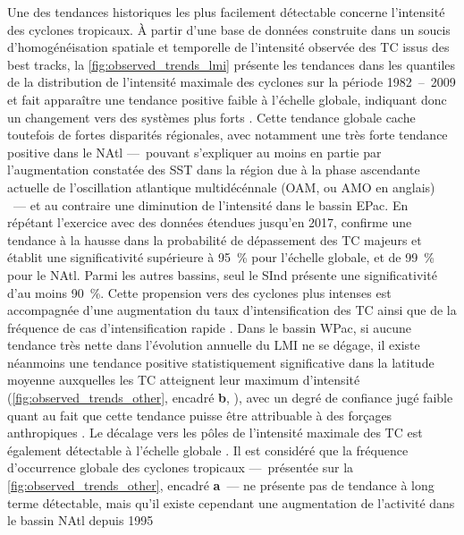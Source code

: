 \documentclass[../main.tex]{subfiles}
\begin{document}
Une des tendances historiques les plus facilement détectable concerne l'intensité des cyclones tropicaux. À partir d'une base de données construite dans un
soucis d'homogénéisation spatiale et temporelle de l'intensité observée des TC issus des best tracks, la \cref{fig:observed_trends_lmi} présente les tendances
dans les quantiles de la distribution de l'intensité maximale des cyclones sur la période \num{1982}~--~\num{2009} et fait apparaître une tendance positive
faible à l'échelle globale, indiquant donc un changement vers des systèmes plus forts \parencite{kossin_trend_2013}. Cette tendance globale cache toutefois de
fortes disparités régionales, avec notamment une très forte tendance positive dans le NAtl ---~pouvant s'expliquer au moins en partie par l'augmentation
constatée des SST dans la région due à la phase ascendante actuelle de l'oscillation atlantique multidécénnale (OAM, ou AMO en anglais)
\parencite{ting_forced_2009}~--- et au contraire une diminution de l'intensité dans le bassin EPac. En répétant l'exercice avec des données étendues jusqu'en
\num{2017}, \cite{kossin_global_2020} confirme une tendance à la hausse dans la probabilité de dépassement des TC majeurs et établit une significativité
supérieure à \SI{95}{\percent} pour l'échelle globale, et de \SI{99}{\percent} pour le NAtl. Parmi les autres bassins, seul le SInd présente une significativité
d'au moins \SI{90}{\percent}. Cette propension vers des cyclones plus intenses est accompagnée d'une augmentation du taux d'intensification des TC ainsi que de
la fréquence de cas d'intensification rapide \parencite{balaguru_increasing_2018,kishtawal_tropical_2012}. Dans le bassin WPac, si aucune tendance très nette
dans l'évolution annuelle du LMI ne se dégage, il existe néanmoins une tendance positive statistiquement significative dans la latitude moyenne auxquelles les
TC atteignent leur maximum d'intensité (\cref{fig:observed_trends_other}, encadré \textbf{b}, \hbox{\cite{kossin_comment_2018}}), avec un degré de confiance
jugé faible quant au  fait que cette tendance puisse être attribuable à des forçages anthropiques \parencite{knutson_tropical_2019}. Le décalage vers les pôles
de l'intensité maximale des TC est également détectable à l'échelle globale \parencite{kossin_poleward_2014}. Il est considéré que la fréquence d'occurrence
globale des cyclones tropicaux ---~présentée sur la \cref{fig:observed_trends_other}, encadré \textbf{a}~--- ne présente pas de tendance à long terme
détectable, mais qu'il existe cependant une augmentation de l'activité dans le bassin NAtl depuis \num{1995}
\end{document}
